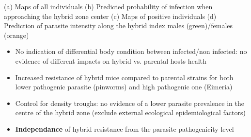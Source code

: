 \documentclass[24pt, a0paper, portrait, margin=0mm, innermargin=10mm,
               blockverticalspace=15mm, blocktitlewidthratio=0.5, colspace=10mm, 
               subcolspace=8mm]{tikzposter}
\begin{document}
{\begin{multicols*}{2}
      \end{multicols*}
(a) Maps of all individuals (b) Predicted probability of infection when approaching the hybrid zone center (c) Maps of positive individuals (d) Prediction of parasite intensity along the hybrid index \newline
males (green)/females (orange)

\begin{itemize}
\item No indication of differential body condition between infected/non infected: no evidence of different impacts on hybrid vs. parental hosts health
\end{itemize}
}

{

\begin{itemize}
  \item Increased resistance of hybrid mice compared to parental strains for both lower pathogenic parasite (pinworms) and high pathogenic one (Eimeria)
  \item Control for density troughs: no evidence of a lower parasite prevalence in the centre of the hybrid zone (exclude external ecological epidemiological factors)
  \item \textbf{Independance} of hybrid resistance from the parasite pathogenicity level
  
\end{itemize}
}



\begin{columns} 
   
   
\end{columns}

\end{document}
